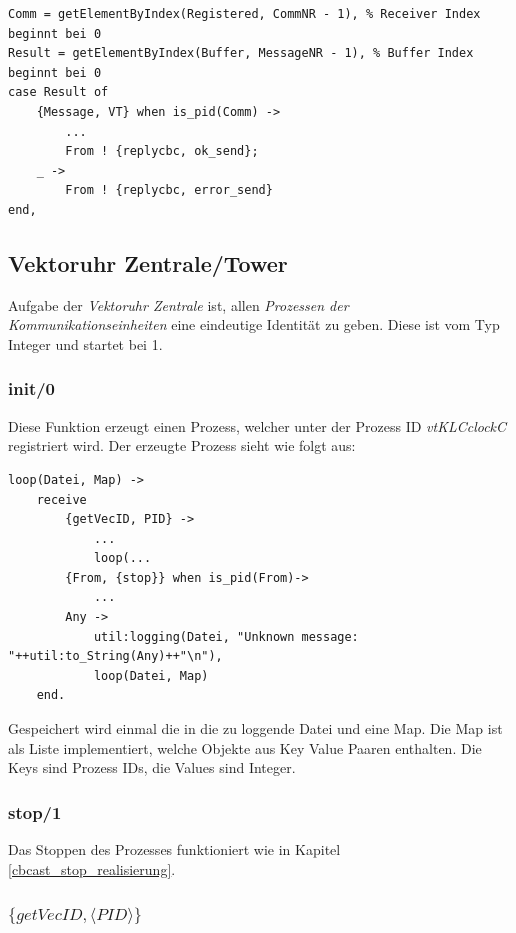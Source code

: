 \begin{lstlisting}[caption={Codeausschnitt multicastM},captionpos=b, label={towercbc_m_realisierung_code}]
Comm = getElementByIndex(Registered, CommNR - 1), % Receiver Index beginnt bei 0
Result = getElementByIndex(Buffer, MessageNR - 1), % Buffer Index beginnt bei 0
case Result of
    {Message, VT} when is_pid(Comm) -> 
        ...
        From ! {replycbc, ok_send};
    _ -> 
        From ! {replycbc, error_send}
end,
\end{lstlisting}

\subsection{Vektoruhr Zentrale/Tower}

Aufgabe der \textit{Vektoruhr Zentrale} ist, allen \textit{Prozessen der Kommunikationseinheiten} eine eindeutige Identität zu geben. Diese ist vom Typ Integer und startet bei 1.

\subsubsection{init/0}

Diese Funktion erzeugt einen Prozess, welcher unter der Prozess ID \textit{vtKLCclockC} registriert wird. Der erzeugte Prozess sieht wie folgt aus:

\begin{lstlisting}
loop(Datei, Map) ->
    receive
        {getVecID, PID} ->
            ...
            loop(...
        {From, {stop}} when is_pid(From)->
            ...
        Any -> 
            util:logging(Datei, "Unknown message: "++util:to_String(Any)++"\n"),
            loop(Datei, Map)
    end.
\end{lstlisting}

Gespeichert wird einmal die in die zu loggende Datei und eine Map. Die Map ist als Liste implementiert, welche Objekte aus Key Value Paaren enthalten. Die Keys sind Prozess IDs, die Values sind Integer.

\subsubsection{stop/1}

Das Stoppen des Prozesses funktioniert wie in Kapitel \ref{cbcast_stop_realisierung}.

\subsubsection{$\{getVecID,\langle PID\rangle\}$}

